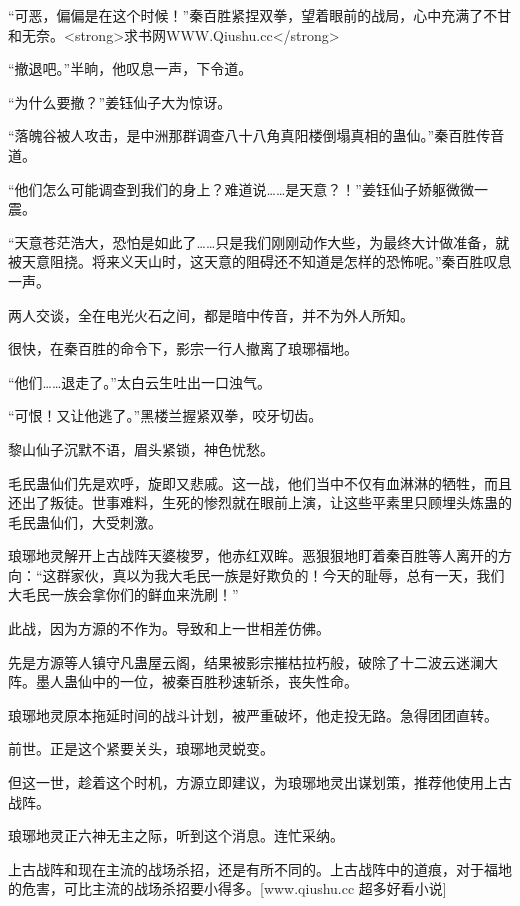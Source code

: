 
\begin{this_body}

“可恶，偏偏是在这个时候！”秦百胜紧捏双拳，望着眼前的战局，心中充满了不甘和无奈。<strong>求书网WWW.Qiushu.cc</strong>

“撤退吧。”半晌，他叹息一声，下令道。

“为什么要撤？”姜钰仙子大为惊讶。

“落魄谷被人攻击，是中洲那群调查八十八角真阳楼倒塌真相的蛊仙。”秦百胜传音道。

“他们怎么可能调查到我们的身上？难道说……是天意？！”姜钰仙子娇躯微微一震。

“天意苍茫浩大，恐怕是如此了……只是我们刚刚动作大些，为最终大计做准备，就被天意阻挠。将来义天山时，这天意的阻碍还不知道是怎样的恐怖呢。”秦百胜叹息一声。

两人交谈，全在电光火石之间，都是暗中传音，并不为外人所知。

很快，在秦百胜的命令下，影宗一行人撤离了琅琊福地。

“他们……退走了。”太白云生吐出一口浊气。

“可恨！又让他逃了。”黑楼兰握紧双拳，咬牙切齿。

黎山仙子沉默不语，眉头紧锁，神色忧愁。

毛民蛊仙们先是欢呼，旋即又悲戚。这一战，他们当中不仅有血淋淋的牺牲，而且还出了叛徒。世事难料，生死的惨烈就在眼前上演，让这些平素里只顾埋头炼蛊的毛民蛊仙们，大受刺激。

琅琊地灵解开上古战阵天婆梭罗，他赤红双眸。恶狠狠地盯着秦百胜等人离开的方向：“这群家伙，真以为我大毛民一族是好欺负的！今天的耻辱，总有一天，我们大毛民一族会拿你们的鲜血来洗刷！”

此战，因为方源的不作为。导致和上一世相差仿佛。

先是方源等人镇守凡蛊屋云阁，结果被影宗摧枯拉朽般，破除了十二波云迷澜大阵。墨人蛊仙中的一位，被秦百胜秒速斩杀，丧失性命。

琅琊地灵原本拖延时间的战斗计划，被严重破坏，他走投无路。急得团团直转。

前世。正是这个紧要关头，琅琊地灵蜕变。

但这一世，趁着这个时机，方源立即建议，为琅琊地灵出谋划策，推荐他使用上古战阵。

琅琊地灵正六神无主之际，听到这个消息。连忙采纳。

上古战阵和现在主流的战场杀招，还是有所不同的。上古战阵中的道痕，对于福地的危害，可比主流的战场杀招要小得多。[www.qiushu.cc 超多好看小说]


\end{this_body}
